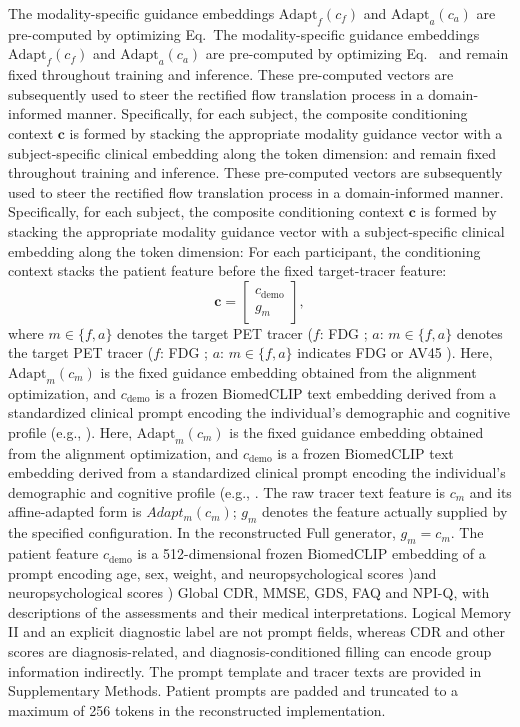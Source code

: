 \documentclass{article}
\providecommand{\DIFaddtex}[1]{{\protect\color{blue} \sf #1}} %
\providecommand{\DIFdeltex}[1]{{\protect\color{red} \ifmmode #1\else\scriptsize #1\fi}} %
\providecommand{\DIFaddbegin}{} %
\providecommand{\DIFaddend}{} %
\providecommand{\DIFdelbegin}{} %
\providecommand{\DIFdelend}{} %
\providecommand{\DIFadd}[1]{\texorpdfstring{\DIFaddtex{#1}}{#1}} %
\providecommand{\DIFdel}[1]{\texorpdfstring{\DIFdeltex{#1}}{}} %
\newcommand{\DIFscaledelfig}{0.5}
\newlength{\DIFdelgraphicswidth} %
\newlength{\DIFdelgraphicsheight} %
\newcommand{\DIFaddincludegraphics}[2][]{{\color{blue}\fbox{\DIFOincludegraphics[#1]{#2}}}} %
\newcommand{\DIFdelincludegraphics}[2][]{%
\sbox{\DIFdelgraphicsbox}{\DIFOincludegraphics[#1]{#2}}%
\settoboxwidth{\DIFdelgraphicswidth}{\DIFdelgraphicsbox} %
\settoboxtotalheight{\DIFdelgraphicsheight}{\DIFdelgraphicsbox} %
\scalebox{\DIFscaledelfig}{%
\parbox[b]{\DIFdelgraphicswidth}{\usebox{\DIFdelgraphicsbox}\\[-\baselineskip] \rule{\DIFdelgraphicswidth}{0em}}\llap{\resizebox{\DIFdelgraphicswidth}{\DIFdelgraphicsheight}{%
\setlength{\unitlength}{\DIFdelgraphicswidth}%
\begin{picture}(1,1)%
\thicklines\linethickness{2pt} %
{\color[rgb]{1,0,0}\put(0,0){\framebox(1,1){}}}%
{\color[rgb]{1,0,0}\put(0,0){\line( 1,1){1}}}%
{\color[rgb]{1,0,0}\put(0,1){\line(1,-1){1}}}%
\end{picture}%
}\hspace*{3pt}}} %
} %
\DeclareRobustCommand{\DIFaddbegin}{\DIFOaddbegin \let\includegraphics\DIFaddincludegraphics} %
\DeclareRobustCommand{\DIFaddend}{\DIFOaddend \let\includegraphics\DIFOincludegraphics} %
\DeclareRobustCommand{\DIFdelbegin}{\DIFOdelbegin \let\includegraphics\DIFdelincludegraphics} %
\DeclareRobustCommand{\DIFdelend}{\DIFOaddend \let\includegraphics\DIFOincludegraphics} %
\begin{document}
\DIFdelbegin \DIFdel{The modality-specific guidance embeddings $\text{Adapt}_f(c_f)$ and $\text{Adapt}_a(c_a)$ are pre-computed by optimizing Eq.~}%
\DIFdel{and remain fixed throughout training and inference. These pre-computed vectors are subsequently used to steer the rectified flow translation process in a domain-informed manner. Specifically, for each subject, the composite conditioning context $\mathbf{c} $ is formed by stacking the appropriate modality guidance vector with a subject-specific clinical embedding along the token dimension:
}\DIFdelend \DIFaddbegin \DIFadd{For each participant, the conditioning context stacks the patient feature before the fixed target-tracer feature:
}\DIFaddend \begin{equation}
\mathbf{c}=\DIFdelbegin %
\DIFdelend \DIFaddbegin \begin{bmatrix}c_{\mathrm{demo}}\\g_m\end{bmatrix}\DIFaddend ,
\label{eq:composite_conditioning}
\end{equation}
where \DIFdelbegin \DIFdel{$m \in \{f, a\}$ denotes the target PET tracer ($f$: FDG ; $a$: }\DIFdelend \DIFaddbegin \DIFadd{$m\in\{f,a\}$ indicates FDG or }\DIFaddend AV45\DIFdelbegin \DIFdel{). Here, $\text{Adapt}_m(c_m)$ is the fixed guidance embedding obtained from the alignment optimization, and $c_{\text{demo}} $ is a frozen BiomedCLIP text embedding derived from a standardized clinical prompt encoding the individual’s demographic and cognitive profile (e.g., }\DIFdelend \DIFaddbegin \DIFadd{. The raw tracer text feature is $c_m$ and its affine-adapted form is $Adapt_m(c_m)$; $g_m$ denotes the feature actually supplied by the specified configuration. In the reconstructed Full generator, $g_m=c_m$. The patient feature $c_{\mathrm{demo}}$ is a 512-dimensional frozen BiomedCLIP embedding of a prompt encoding }\DIFaddend age, sex, weight, \DIFdelbegin \DIFdel{and neuropsychological scores )}\DIFdelend \DIFaddbegin \DIFadd{Global CDR, MMSE, GDS, FAQ and NPI-Q, with descriptions of the assessments and their medical interpretations. Logical Memory II and an explicit diagnostic label are not prompt fields, whereas CDR and other scores are diagnosis-related, and diagnosis-conditioned filling can encode group information indirectly. The prompt template and tracer texts are provided in Supplementary Methods. Patient prompts are padded and truncated to a maximum of 256 tokens in the reconstructed implementation}\DIFaddend .
\end{document}
